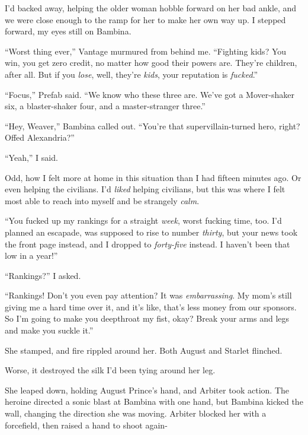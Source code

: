 I'd backed away, helping the older woman hobble forward on her bad ankle, and we were close enough to the ramp for her to make her own way up.  I stepped forward, my eyes still on Bambina.



``Worst thing ever,'' Vantage murmured from behind me.  ``Fighting kids?  You win, you get zero credit, no matter how good their powers are.  They're children, after all.  But if you \emph{lose}, well, they're \emph{kids}, your reputation is \emph{fucked}.''



``Focus,'' Prefab said.  ``We know who these three are.  We've got a Mover-shaker six, a blaster-shaker four, and a master-stranger three.''



``Hey, Weaver,'' Bambina called out.  ``You're that supervillain-turned hero, right?  Offed Alexandria?''



``Yeah,'' I said.



Odd, how I felt more at home in this situation than I had fifteen minutes ago.  Or even helping the civilians.  I'd \emph{liked} helping civilians, but this was where I felt most able to reach into myself and be strangely \emph{calm}.



``You fucked up my rankings for a straight \emph{week}, worst fucking time, too.  I'd planned an escapade, was supposed to rise to number \emph{thirty}, but your news took the front page instead, and I dropped to \emph{forty-five} instead.  I haven't been that low in a year!''



``Rankings?'' I asked.



``Rankings!  Don't you even pay attention?  It was \emph{embarrassing}.  My mom's still giving me a hard time over it, and it's like, that's less money from our sponsors.  So I'm going to make you deepthroat my fist, okay?  Break your arms and legs and make you suckle it.''



She stamped, and fire rippled around her.  Both August and Starlet flinched.



Worse, it destroyed the silk I'd been tying around her leg.



She leaped down, holding August Prince's hand, and Arbiter took action.  The heroine directed a sonic blast at Bambina with one hand, but Bambina kicked the wall, changing the direction she was moving.  Arbiter blocked her with a forcefield, then raised a hand to shoot again-



